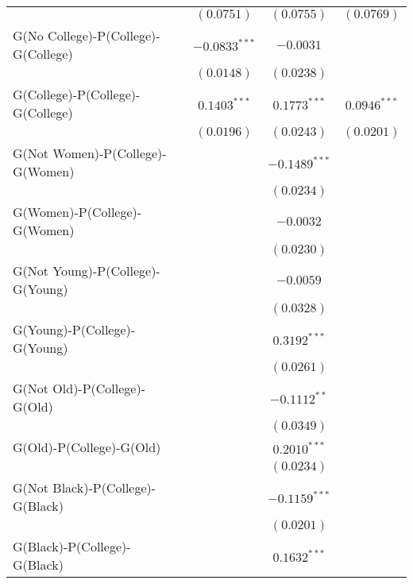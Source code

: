 \begin{center}
\begin{longtable}{l c c c}
                                    & $(0.0751)$      & $(0.0755)$      & $(0.0769)$      \\
G(No College)-P(College)-G(College) & $-0.0833^{***}$ & $-0.0031$       &                 \\
                                    & $(0.0148)$      & $(0.0238)$      &                 \\
G(College)-P(College)-G(College)    & $0.1403^{***}$  & $0.1773^{***}$  & $0.0946^{***}$  \\
                                    & $(0.0196)$      & $(0.0243)$      & $(0.0201)$      \\
G(Not Women)-P(College)-G(Women)    &                 & $-0.1489^{***}$ &                 \\
                                    &                 & $(0.0234)$      &                 \\
G(Women)-P(College)-G(Women)        &                 & $-0.0032$       &                 \\
                                    &                 & $(0.0230)$      &                 \\
G(Not Young)-P(College)-G(Young)    &                 & $-0.0059$       &                 \\
                                    &                 & $(0.0328)$      &                 \\
G(Young)-P(College)-G(Young)        &                 & $0.3192^{***}$  &                 \\
                                    &                 & $(0.0261)$      &                 \\
G(Not Old)-P(College)-G(Old)        &                 & $-0.1112^{**}$  &                 \\
                                    &                 & $(0.0349)$      &                 \\
G(Old)-P(College)-G(Old)            &                 & $0.2010^{***}$  &                 \\
                                    &                 & $(0.0234)$      &                 \\
G(Not Black)-P(College)-G(Black)    &                 & $-0.1159^{***}$ &                 \\
                                    &                 & $(0.0201)$      &                 \\
G(Black)-P(College)-G(Black)        &                 & $0.1632^{***}$  &                 \\

\end{longtable}
\end{center}
